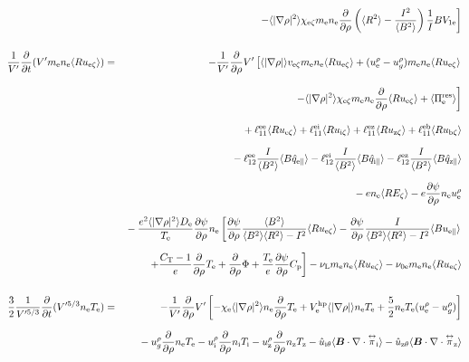 \documentclass[11pt]{article}
\def\bvec#1{\leavevmode\hbox{\boldmath$#1$}}
\let\vec=\bvec
\def\r#1{{\rm#1}}
\def\aves#1{\langle#1\rangle}
\def\dd#1#2{\frac{\partial #1}{\partial #2}}
\def\tensor#1{\mathord{\displaystyle\mathop{#1}^\leftrightarrow}}
\def\para{\parallel}
\def\ddrho{\frac{\partial}{\partial\rho}}
\def\ddt{\frac{\partial}{\partial t}}
\def\me{m_\r{e}}
\def\nee{n_\r{e}}
\def\ni{n_\r{i}}
\def\nz{n_\r{z}}
\def\Te{T_\r{e}}
\def\Ti{T_\r{i}}
\def\Tz{T_\r{z}}
\def\uzt#1{u_{\r{#1}\zeta}}
\def\upara#1{u_{\r{#1}\para}}
\def\uhatth#1{\hat{u}_{\r{#1}\theta}}
\def\qhatpara#1{\hat{q}_{\r{#1}\para}}
\def\urho#1{u_\r{#1}^\rho}
\def\ugrho{u_{g}^\rho}
\def\chis#1{\chi_\r{#1}}
\def\De{D_\r{e}}
\def\nun#1{\nu_\r{0#1}}
\def\bri{\aves{B^2}\aves{R^2} - I^2}
\def\nuL{\nu_\r{L}}
\begin{document}
\begin{eqnarray}
\nonumber\\[3mm]&&{}
    \left.- \aves{|\nabla\rho|^2} \chis{e\zeta} \me \nee
          \ddrho \left(\aves{R^2} - \frac{I^2}{\aves{B^2}}\right) \frac{1}{I}BV_{1\r{e}}\right]
\\[5mm]
 \frac{1}{V'} \ddt (V' \me \nee \aves{R \uzt{e}}) &=&
%
  - \frac{1}{V'} \ddrho V' \left[  \aves{|\nabla\rho|} v_{\r{e}\zeta} \me \nee \aves{R \uzt{e}}
			       +   (\urho{e} - \ugrho) \me \nee \aves{R \uzt{e}} \right.
\nonumber\\[3mm]&&{}
                           \left.- \aves{|\nabla\rho|^2} \chis{e\zeta} \me \nee \ddrho \aves{R \uzt{e}}
                               + \aves{\Pi_\r{e}^\r{res}} \right]
\nonumber\\[3mm]&&{}
%
  + \ell_{11}^\r{ee} \aves{R \uzt{e}}
  + \ell_{11}^\r{ei} \aves{R \uzt{i}}
  + \ell_{11}^\r{ez} \aves{R \uzt{z}}
  + \ell_{11}^\r{eb} \aves{R \uzt{b}}
\nonumber\\[2.5mm]&&{}
%
  - \ell_{12}^\r{ee} \frac{I}{\aves{B^2}} \aves{B \qhatpara{e}}
  - \ell_{12}^\r{ei} \frac{I}{\aves{B^2}} \aves{B \qhatpara{i}}
  - \ell_{12}^\r{ez} \frac{I}{\aves{B^2}} \aves{B \qhatpara{z}}
\nonumber\\[2.5mm]&&{}
%
  - e                 \nee \aves{R E_\zeta}
%
  - e \dd{\psi}{\rho} \nee \urho{e}
%
\nonumber\\[2.5mm]&&{}
%
%
  - \frac{e^2 \aves{|\nabla\rho|^2} \De}{\Te} \dd{\psi}{\rho} \nee
    \left[  \dd{\psi}{\rho} \frac{\aves{B^2}}{\bri} \aves{R \uzt{e}}
          - \dd{\psi}{\rho} \frac{I}{\bri} \aves{B \upara{e}} \right.
\nonumber\\[2.5mm]&&{}
    \left.+ \frac{C_\r{T}-1}{e} \ddrho \Te
	  + \ddrho \Phi
	  + \frac{\Te}{e} \dd{\psi}{\rho} C_\r{p} \right]
%
  - \nuL  \me \nee \aves{R \uzt{e}}
%
  - \nun{e} \me \nee \aves{R \uzt{e}}
\\[5mm]
 \frac{3}{2}\frac{1}{V'^{5/3}} \ddt (V'^{5/3} \nee \Te ) &=& 
%
  - \frac{1}{V'} \ddrho V'
    \left[ - \chis{e}       \aves{|\nabla\rho|^2} \nee \ddrho \Te
           + V_\r{e}^\r{hp} \aves{|\nabla\rho|}   \nee \Te
           + \frac{5}{2} \nee \Te ( \urho{e} - \ugrho ) \right]
\nonumber\\[2.5mm]&&{}
%
  - \ugrho \ddrho \nee \Te
%
  - \urho{i} \ddrho \ni  \Ti
  - \urho{z} \ddrho \nz  \Tz
  - \uhatth{i} \aves{\vec{B}\cdot\nabla\cdot\tensor{\pi}_\r{i}}
  - \uhatth{z} \aves{\vec{B}\cdot\nabla\cdot\tensor{\pi}_\r{z}}
\nonumber\\[2.5mm]&&{}

\end{eqnarray}
\end{document}
